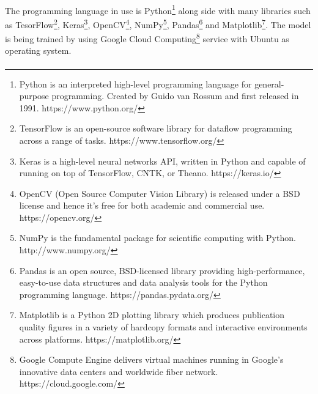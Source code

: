 \documentclass[12pt]{report}
\begin{document}
        \paragraph{}
            The programming language in use is Python\footnote{Python is an interpreted high-level programming language for general-purpose programming. Created by Guido van Rossum and first released in 1991. https://www.python.org/} along side with many
            libraries such as TesorFlow\footnote{TensorFlow is an open-source software library for dataflow programming across a range of tasks. https://www.tensorflow.org/},
            Keras\footnote{Keras is a high-level neural networks API, written in Python and capable of running on top of TensorFlow, CNTK, or Theano. https://keras.io/}, 
            OpenCV\footnote{OpenCV (Open Source Computer Vision Library) is released under a BSD license and hence it’s free for both academic and commercial use. https://opencv.org/}, 
            NumPy\footnote{NumPy is the fundamental package for scientific computing with Python. http://www.numpy.org/}, 
            Pandas\footnote{Pandas is an open source, BSD-licensed library providing high-performance, easy-to-use data structures and data analysis tools for the Python programming language. https://pandas.pydata.org/}
            and Matplotlib\footnote{Matplotlib is a Python 2D plotting library which produces publication quality figures in a variety of hardcopy formats and interactive environments across platforms. https://matplotlib.org/}.
            The model is being trained by using Google Cloud Computing\footnote{Google Compute Engine delivers virtual machines running in Google's innovative data centers and worldwide fiber network. https://cloud.google.com/} service with Ubuntu as operating system.
        
        \paragraph{}

        
    
\end{document}
